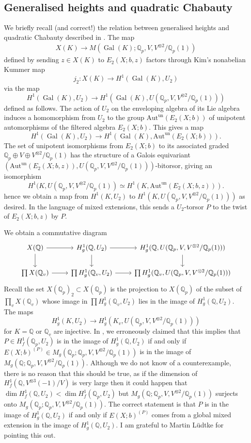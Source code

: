 \documentclass[11pt]{amsart}
\def\Q{\mathbb Q}
\def\Aut{\mathrm{Aut}}
\theoremstyle{plain}
\theoremstyle{definition}
\DeclareMathOperator{\un}{un}
\DeclareMathOperator{\Gal}{Gal}
\begin{document}
\subsection{Generalised heights and quadratic Chabauty}\label{ludtke}
We briefly recall (and correct!) the relation between generalised heights and quadratic Chabauty described in \cite{QC2}. The map
\begin{align*}
X(K)\to M(\Gal (K);\Q _p ,V,V^{\otimes 2}/\Q _p (1))
\end{align*}
defined by sending $z\in X(K)$ to $E_2 (X;b,z)$ factors through Kim's nonabelian Kummer map
\[
j_2 :X(K)\to H^1 (\Gal (K),U_2 )
\]
via the map
\[
H^1 (\Gal (K),U_2 )\to H^1 (\Gal (K),U(\Q _p ,V,V^{\otimes 2}/\Q _p (1)))
\]
defined as follows. The action of $U_2 $ on the enveloping algebra of its Lie algebra induces a homomorphism from $U_2 $ to the group $\Aut ^{\un }(E_2 (X;b))$ of unipotent automorphisms of the filtered algebra $E_2 (X;b)$. This gives a map
\[
H^1 (\Gal (K),U_2 )\to H^1 (\Gal (K),\Aut ^{\un }(E_2 (X;b))).
\]
The set of unipotent isomorphisms from $E_2 (X;b)$ to its associated graded $\Q _p \oplus V\oplus V^{\otimes 2}/\Q _p (1)$ has the structure of a Galois equivariant \\
$(\Aut ^{\un }(E_2 (X;b,z)),U(\Q _p ,V,V^{\otimes 2}/\Q _p (1)))$-bitorsor, giving an isomorphism
\[
H^1 (K,U(\Q _p ,V,V^{\otimes 2}/\Q _p (1))\simeq H^1 (K,\Aut ^{\un }(E_2 (X;b,z))).
\]
hence we obtain a map from $H^1 (K,U_2 )$ to $H^1 (K,U(\Q _p ,V,V^{\otimes 2}/\Q _p (1)))$ as desired. In the language of mixed extensions, this sends a $U_2 $-torsor $P$ to the twist of $E_2 (X;b,z)$ by $P$.

We obtain a commutative diagram
\[
\begin{tikzcd}
X(\Q ) \arrow[d] \arrow[r] & H^1 _g (\Q ,U_2 ) \arrow[d] \arrow[r] & H^1 _g (\Q ,U(\Q _p ,V,V^{\otimes 2}/\Q _p (1))) \arrow[d] \\
\prod X(\Q _v ) \arrow[r]           & \prod H^1 _g (\Q _v ,U_2 ) \arrow[r]            & \prod H^1 _g (\Q _v ,U(\Q _p ,V,V^{\otimes 2}/\Q _p (1)))          
\end{tikzcd}
\]
Recall the set $X(\Q _p )_2 \subset X(\Q _p )$ is the projection to $X(\Q _p )$ of the subset of $\prod _v X(\Q _v )$ whose image in $\prod H^1 _g (\Q _v ,U_2 )$ lies in the image of $H^1 _g (\Q ,U_2 )$. The maps
\[
H^1 _g (K,U_2 )\to H^1 _g (K_v ,U(\Q _p ,V,V^{\otimes 2}/\Q _p (1)))
\]
for $K=\Q $ or $\Q _v$ are injective. In \cite[Proof of Lemma 4.1]{QC2}, we erroneously claimed that this implies that $P\in H^1 _f (\Q _p ,U_2 )$ is in the image of $H^1 _g (\Q ,U_2 )$ if and only if $E(X;b)^{(P)}\in M_g (\Q _p ;\Q _p ,V,V^{\otimes 2}/\Q _p (1))$ is in the image of $M_g (\Q ;\Q _p ,V,V^{\otimes 2}/\Q _p (1))$. Although we do not know of a counterexample, there is no reason that this should be true, as if the dimension of $H^1 _f (\Q ,V^{\otimes 3}(-1)/V)$ is very large then it could happen that $\dim H^1 _f (\Q ,U_2 )<\dim H^1 _f (\Q _p ,U_2 )$ but $M_g (\Q ;\Q _p ,V,V^{\otimes 2}/\Q _p (1))$ surjects onto $M_g (\Q _p ;\Q _p ,V,V^{\otimes 2}/\Q _p (1))$. The correct statement is that $P$ is in the image of $H^1 _g (\Q ,U_2 )$ if and only if $E(X;b)^{(P)}$ comes from a global mixed extension in the image of $H^1 _g (\Q ,U_2 )$. I am grateful to Martin L\"udtke for pointing this out.
\end{document}
